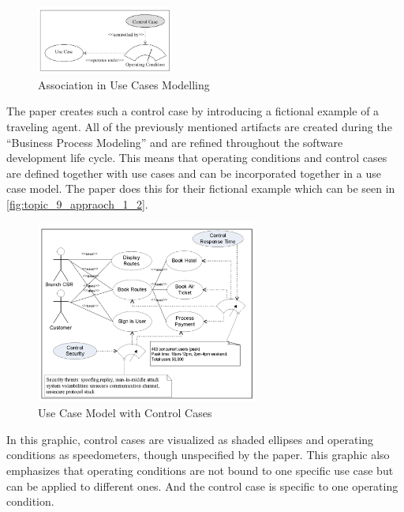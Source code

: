 \begin{figure}[htbp]
	\centering
	\includegraphics[width=0.4\textwidth]{../images/topic_9_approach_1_1.png}
	\caption{Association in Use Cases Modelling~\cite{ZouPavlovski2008}}
	\label{fig:topic_9_appraoch_1_use_case}
\end{figure}

The paper creates such a control case by introducing a fictional example of a traveling agent.
All of the previously mentioned artifacts are created during the \enquote{Business Process Modeling} and are refined throughout the software development life cycle.
This means that operating conditions and control cases are defined together with use cases and can be incorporated together in a use case model.
The paper does this for their fictional example which can be seen in \autoref{fig:topic_9_appraoch_1_2}. 

\begin{figure}[h!]
	\centering
	\includegraphics[width=0.65\textwidth]{../images/topic_9_approach_1_2.png}
	\caption{Use Case Model with Control Cases~\cite{ZouPavlovski2008}}
	\label{fig:topic_9_appraoch_1_2}
\end{figure}

In this graphic, control cases are visualized as shaded ellipses and operating conditions as speedometers, though unspecified by the paper. 
This graphic also emphasizes that operating conditions are not bound to one specific use case but can be applied to different ones.
And the control case is specific to one operating condition.


